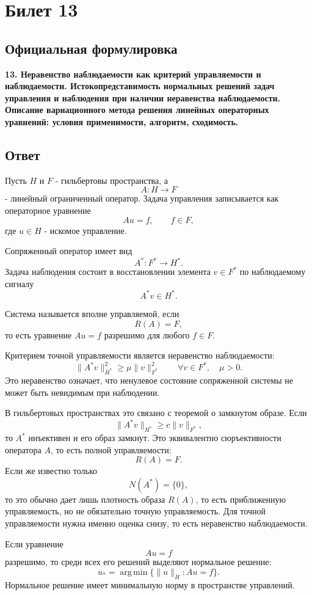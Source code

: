 \documentclass[12pt,a4paper]{article}
\begin{document}
\newpage
\section*{Билет 13}

\subsection*{Официальная формулировка}
\textbf{13. Неравенство наблюдаемости как критерий управляемости и наблюдаемости. Истокопредставимость нормальных решений задач управления и наблюдения при наличии неравенства наблюдаемости. Описание вариационного метода решения линейных операторных уравнений: условия применимости, алгоритм, сходимость.}

\subsection*{Ответ}
Пусть $H$ и $F$ - гильбертовы пространства, а
\[
 A:H\to F
\]
- линейный ограниченный оператор. Задача управления записывается как операторное уравнение
\[
 Au=f,\qquad f\in F,
\]
где $u\in H$ - искомое управление.

Сопряженный оператор имеет вид
\[
 A^*:F^*\to H^*.
\]
Задача наблюдения состоит в восстановлении элемента $v\in F^*$ по наблюдаемому сигналу
\[
 A^*v\in H^*.
\]

Система называется вполне управляемой, если
\[
 R(A)=F,
\]
то есть уравнение $Au=f$ разрешимо для любого $f\in F$.

Критерием точной управляемости является неравенство наблюдаемости:
\[
 \|A^*v\|_{H^*}^2\ge \mu\|v\|_{F^*}^2
 \qquad \forall v\in F^*,\quad \mu>0.
\]
Это неравенство означает, что ненулевое состояние сопряженной системы не может быть невидимым при наблюдении.

В гильбертовых пространствах это связано с теоремой о замкнутом образе. Если
\[
 \|A^*v\|_{H^*}\ge c\|v\|_{F^*},
\]
то $A^*$ инъективен и его образ замкнут. Это эквивалентно сюръективности оператора $A$, то есть полной управляемости:
\[
 R(A)=F.
\]
Если же известно только
\[
 N(A^*)=\{0\},
\]
то это обычно дает лишь плотность образа $R(A)$, то есть приближенную управляемость, но не обязательно точную управляемость. Для точной управляемости нужна именно оценка снизу, то есть неравенство наблюдаемости.

Если уравнение
\[
 Au=f
\]
разрешимо, то среди всех его решений выделяют нормальное решение:
\[
 u_*=
 \operatorname*{arg\,min}\{\|u\|_H: Au=f\}.
\]
Нормальное решение имеет минимальную норму в пространстве управлений.
\end{document}
